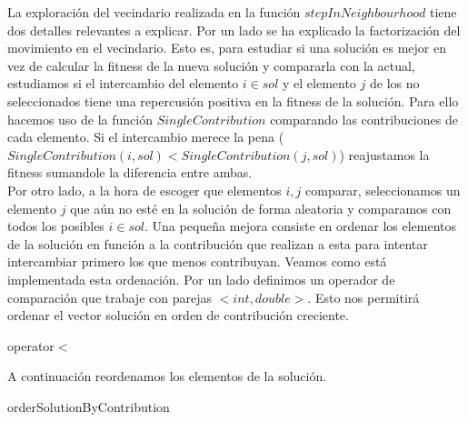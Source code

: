 \documentclass[11pt,a4paper]{article}
\begin{document}
	La exploración del vecindario realizada en la función $stepInNeighbourhood$ tiene dos detalles relevantes a explicar. Por un lado se ha explicado la factorización del movimiento en el vecindario. Esto es, para estudiar si una solución es mejor en vez de calcular la fitness de la nueva solución y compararla con la actual, estudiamos si el intercambio del elemento $i \in sol$ y el elemento $j$ de los no seleccionados tiene una repercusión positiva en la fitness de la solución. Para ello hacemos uso de la función $SingleContribution$ comparando las contribuciones de cada elemento. Si el intercambio merece la pena ($SingleContribution(i,sol) < SingleContribution(j,sol)$) reajustamos la fitness sumandole la diferencia entre ambas. \\
	
	Por otro lado, a la hora de escoger que elementos $i,j$ comparar, seleccionamos un elemento $j$ que aún no esté en la solución de forma aleatoria y comparamos con todos los posibles $i \in sol$. Una pequeña mejora consiste en ordenar los elementos de la solución en función a la contribución que realizan a esta para intentar intercambiar primero los que menos contribuyan. Veamos como está implementada esta ordenación. Por un lado definimos un operador de comparación que trabaje con parejas $<int, double>$. Esto nos permitirá ordenar el vector solución en orden de contribución creciente. \\
	
	\begin{algorithm}[H]
	 	\caption{operator$<$}
	\end{algorithm}

	A continuación reordenamos los elementos de la solución. \\

	\begin{algorithm}[H]
		\caption{orderSolutionByContribution}
	\end{algorithm}
\end{document}
